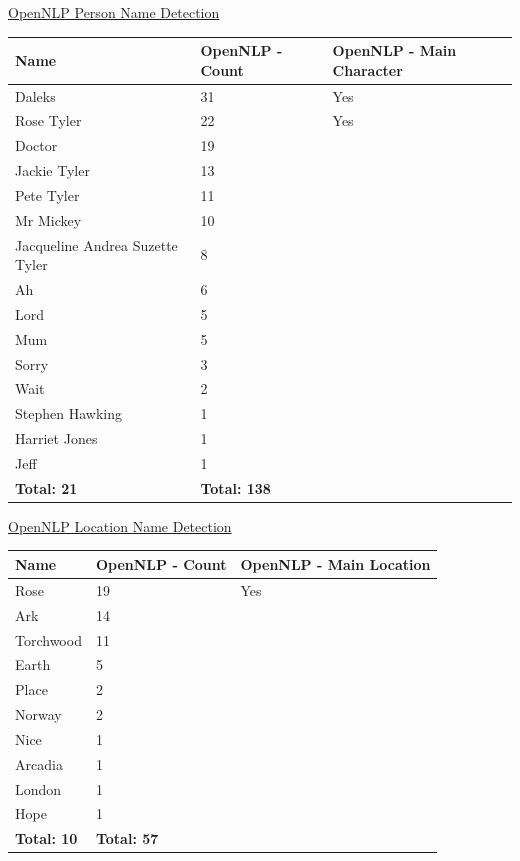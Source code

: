 \underline{OpenNLP Person Name Detection}
\begin{center}
\begin{tabular}{|p{160pt}|p{90pt}|p{140pt}|}
\hline
Name						&OpenNLP - Count		&OpenNLP - Main Character\\\hline
Daleks						&31					&Yes				\\\hline
Rose Tyler					&22					&Yes				\\\hline
Doctor						&19					&				\\\hline
Jackie Tyler					&13					&				\\\hline
Pete Tyler						&11					&				\\\hline			
Mr Mickey					&10					&				\\\hline	
Jacqueline Andrea Suzette Tyler	&8					&				\\\hline	
Ah							&6					&				\\\hline	
Lord							&5					&				\\\hline	
Mum 						&5					&				\\\hline	
Sorry						&3					&				\\\hline	
Wait							&2					&				\\\hline	
Stephen Hawking				&1					&				\\\hline	
Harriet Jones					&1					&				\\\hline	
Jeff							&1					&				\\\hline	
\textbf{Total: 21}				&\textbf{Total: 138}		&				\\\hline
\end{tabular}
\end{center}	

\newpage
\underline{OpenNLP Location Name Detection}
\begin{center}
\begin{tabular}{|p{160pt}|p{90pt}|p{140pt}|}
\hline
\textbf{Name}		&\textbf{OpenNLP - Count}	&\textbf{OpenNLP - Main Location}\\\hline
Rose			&19				&Yes		\\\hline
Ark			&14				&		\\\hline
Torchwood	&11				&		\\\hline
Earth		&5				&		\\\hline
Place		&2				&		\\\hline
Norway		&2				&		\\\hline
Nice			&1				&		\\\hline
Arcadia		&1				&		\\\hline
London		&1				&		\\\hline
Hope		&1				&		\\\hline
\textbf{Total: 10}	& \textbf{Total: 57}	&	\\\hline
\end{tabular}
\end{center}

